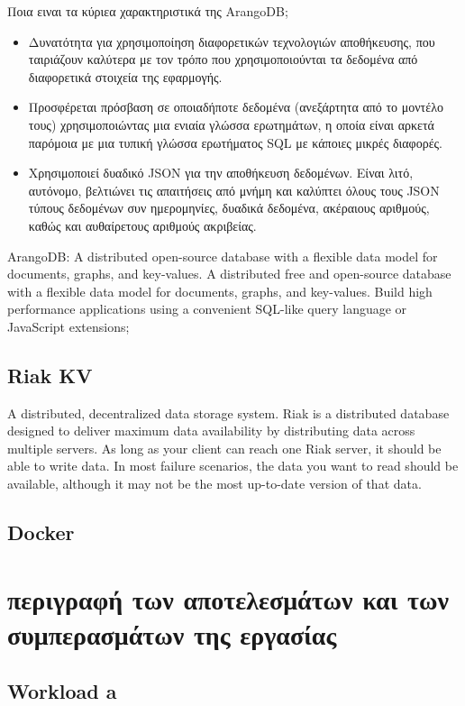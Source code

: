 \documentclass[conference]{IEEEtran}
\begin{document}
Ποια ειναι τα κύριεα χαρακτηριστικά της ArangoDB;
\begin{itemize}
    \item 
    Δυνατότητα για χρησιμοποίηση διαφορετικών τεχνολογιών αποθήκευσης, που ταιριάζουν καλύτερα με τον τρόπο που χρησιμοποιούνται τα δεδομένα από διαφορετικά στοιχεία της εφαρμογής.
    
    \item 
    Προσφέρεται πρόσβαση σε οποιαδήποτε δεδομένα (ανεξάρτητα από το μοντέλο τους) χρησιμοποιώντας μια ενιαία γλώσσα ερωτημάτων, η οποία είναι αρκετά παρόμοια με μια τυπική γλώσσα ερωτήματος SQL με κάποιες μικρές διαφορές.

    \item 
    Χρησιμοποιεί δυαδικό JSON για την αποθήκευση δεδομένων. Είναι λιτό, αυτόνομο, βελτιώνει τις απαιτήσεις από μνήμη και καλύπτει όλους τους JSON τύπους δεδομένων συν ημερομηνίες, δυαδικά δεδομένα, ακέραιους αριθμούς, καθώς και αυθαίρετους αριθμούς ακριβείας.
\end{itemize}

ArangoDB: A distributed open-source database with a flexible data model for documents, graphs, and key-values. A distributed free and open-source database with a flexible data model for documents, graphs, and key-values. Build high performance applications using a convenient SQL-like query language or JavaScript extensions;

\subsection{Riak KV}
 A distributed, decentralized data storage system. Riak is a distributed database designed to deliver maximum data availability by distributing data across multiple servers. As long as your client can reach one Riak server, it should be able to write data. In most failure scenarios, the data you want to read should be available, although it may not be the most up-to-date version of that data.

\subsection{Docker}

\section{περιγραφή των αποτελεσμάτων και των συμπερασμάτων της εργασίας}

\subsection{Workload a}    
\end{document}

